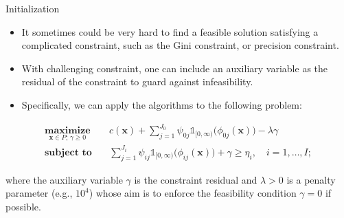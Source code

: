 \documentclass[aspectratio=169,xcolor=dvipsnames]{beamer}
\begin{document}
\begin{frame}{Initialization}
  \small
  \setlength{\abovedisplayskip}{4pt}
  \setlength{\belowdisplayskip}{4pt}

  \begin{itemize}
    \setlength{\itemsep}{0.10cm}
    \item It sometimes could be very hard to find a feasible solution satisfying
      a complicated constraint, such as the Gini constraint, or precision
      constraint.
    \item With challenging constraint, one can include
      \textcolor{MediumRed}{an auxiliary variable} as the residual of the
      constraint to guard against infeasibility.
    \item Specifically, we can apply the algorithms to the following problem:
  \end{itemize}

  \[
    \begin{aligned}
      \operatorname*{\textbf{maximize}}_{\mathbf{x}\in P;\,\gamma\geq 0}\quad
      &c(\mathbf{x})+\sum_{j=1}^{J_0}\psi_{0j}\mathds{1}_{[0,\infty)}
        \bigl(\phi_{0j}(\mathbf{x})\bigr)-\lambda\gamma\\
      \operatorname*{\textbf{subject to}}\quad
      &\sum_{j=1}^{J_i}\psi_{ij}\mathds{1}_{[0,\infty)}
        \bigl(\phi_{ij}(\mathbf{x})\bigr)+\gamma\geq\eta_i,\quad i=1,\ldots,I;
    \end{aligned}
  \]

  \noindent where the auxiliary variable $\gamma$ is the constraint residual and
  $\lambda>0$ is a penalty parameter (e.g., $10^4$) whose aim is to enforce the
  feasibility condition $\gamma=0$ if possible.
\end{frame}
\end{document}
